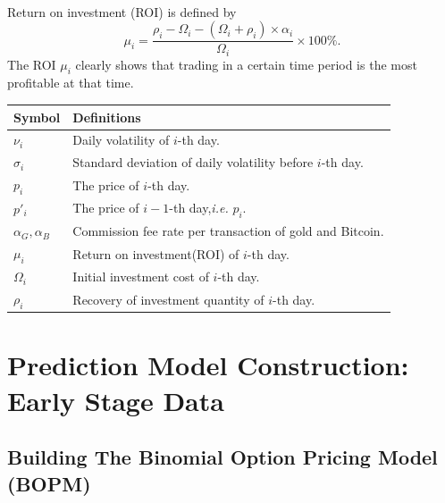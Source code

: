 \documentclass[12pt]{article}
\begin{document}
    \paragraph{}
    Return on investment (ROI) is defined by
    \begin{equation}
        \mu_i=\frac{\rho_i-\Omega_i-(\Omega_i+\rho_i)\times \alpha_i}{\Omega_i}\times 100\%.
    \end{equation}
    The ROI $\mu_i$ clearly shows that trading in a certain time period is the most profitable at that time. 
    \begin{table}
        \begin{center}
        \begin{tabular}{p{80pt}p{280pt}}
        \toprule
        Symbol       & Definitions \\
        \midrule
        $\nu_i$       &  Daily volatility of $i$-th day. \\
        $\sigma_i$    & Standard deviation of daily volatility before $i$-th day. \\
        $p_i$     & The price of $i$-th day. \\
        $p'_i$& The price of $i-1$-th day,\emph{i.e.} $p_i$. \\
        $\alpha_{G},\alpha_{B}$& Commission fee rate per transaction of gold and Bitcoin.\\
        $\mu_i$&Return on investment(ROI) of $i$-th day.\\
        $\Omega_i$ & Initial investment cost of $i$-th day.\\
        $\rho_i$&Recovery of investment quantity of $i$-th day.\\
        \bottomrule 
        \end{tabular}
        \end{center}
        \end{table}
\section{Prediction Model Construction: Early Stage Data }
\subsection{Building The Binomial Option Pricing Model (BOPM)}
\end{document}
